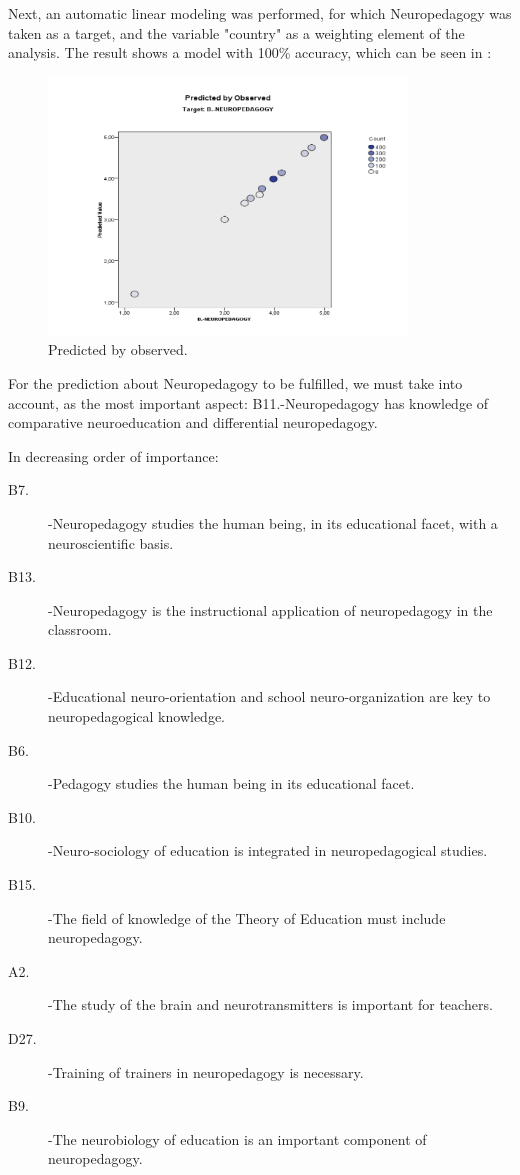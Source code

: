 \documentclass[english]{textolivre}
\begin{document}
Next, an automatic linear modeling was performed, for which Neuropedagogy was taken as a target, and the variable "country" as a weighting element of the analysis. The result shows a model with 100\% accuracy, which can be seen in :
	
\begin{figure}[h!]
 \centering
 \includegraphics[width=0.85\textwidth]{Fig1.png}
 \caption{Predicted by observed.}
 \label{fig01}
\end{figure}

For the prediction about Neuropedagogy to be fulfilled, we must take into account, as the most important aspect:
B11.-Neuropedagogy has knowledge of comparative neuroeducation and differential neuropedagogy. 

In decreasing order of importance:
\begin{description}
    \item[B7.]-Neuropedagogy studies the human being, in its educational facet, with a neuroscientific basis.
    \item[B13.]-Neuropedagogy is the instructional application of neuropedagogy in the classroom.
    \item[B12.]-Educational neuro-orientation and school neuro-organization are key to neuropedagogical knowledge.
    \item[B6.]-Pedagogy studies the human being in its educational facet.
    \item[B10.]-Neuro-sociology of education is integrated in neuropedagogical studies.
    \item[B15.]-The field of knowledge of the Theory of Education must include neuropedagogy.
    \item[A2.]-The study of the brain and neurotransmitters is important for teachers.
    \item[D27.]-Training of trainers in neuropedagogy is necessary.
    \item[B9.]-The neurobiology of education is an important component of neuropedagogy.
\end{description}
\end{document}
